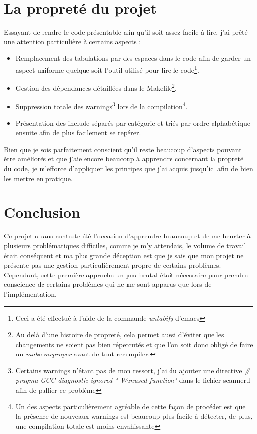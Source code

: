\documentclass[12pt]{article}
\begin{document}
\section{La propreté du projet}
Essayant de rendre le code présentable afin qu'il soit assez facile à lire,
j'ai prêté une attention particulière à certains aspects :
\begin{itemize}
\item Remplacement des tabulations par des espaces dans le code afin de garder
  un aspect uniforme quelque soit l'outil utilisé pour lire le code\footnote{
    Ceci a été effectué à l'aide de la commande {\em untabify} d'emacs}.
\item Gestion des dépendances détaillées dans le Makefile\footnote{Au delà
  d'une histoire de propreté, cela permet aussi d'éviter que les changements
  ne soient pas bien répercutés et que l'on soit donc obligé de faire un
  {\em make mrproper} avant de tout recompiler.}.
\item Suppression totale des warnings\footnote{Certains warnings n'étant pas
  de mon ressort, j'ai du ajouter une directive {\em \# pragma GCC diagnostic
    ignored "-Wunused-function"} dans le fichier scanner.l afin de pallier ce
  problème} lors de la compilation\footnote{Un des aspects particulièrement
  agréable de cette façon de procéder est que la présence de nouveaux warnings
  est beaucoup plus facile à détecter, de plus, une compilation totale est
  moins envahissante}.
\item Présentation des include séparés par catégorie et triés par ordre
  alphabétique ensuite afin de plus facilement se repérer.
\end{itemize} 

Bien que je sois parfaitement conscient qu'il reste beaucoup d'aspects pouvant
être améliorés et que j'aie encore beaucoup à apprendre concernant la propreté
du code, je m'efforce d'appliquer les principes que j'ai acquis jusqu'ici afin
de bien les mettre en pratique.

\section{Conclusion}
Ce projet a sans conteste été l'occasion d'apprendre beaucoup et de me
heurter à plusieurs problématiques difficiles, comme je m'y attendais, le
volume de travail était conséquent et ma plus grande déception est que je
sais que mon projet ne présente pas une gestion particulièrement propre de
certains problèmes. Cependant, cette première approche un peu brutal était
nécessaire pour prendre conscience de certains problèmes qui ne me sont
apparus que lors de l'implémentation.\\
\end{document}
